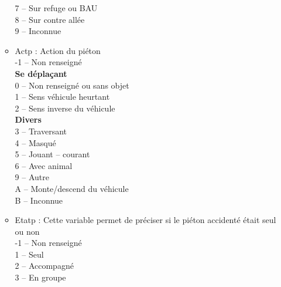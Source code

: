 \documentclass[french,]{tp}
\begin{document}
\begin{itemize}
\begin{itemize}
    7 -- Sur refuge ou BAU\\
    8 -- Sur contre allée\\
    9 -- Inconnue
  \item
    Actp : Action du piéton\\
    -1 -- Non renseigné\\
    \textbf{Se déplaçant}\\
    0 -- Non renseigné ou sans objet\\
    1 -- Sens véhicule heurtant\\
    2 -- Sens inverse du véhicule\\
    \textbf{Divers}\\
    3 -- Traversant\\
    4 -- Masqué\\
    5 -- Jouant -- courant\\
    6 -- Avec animal\\
    9 -- Autre\\
    A -- Monte/descend du véhicule\\
    B -- Inconnue
  \item
    Etatp : Cette variable permet de préciser si le piéton accidenté était seul ou non\\
    -1 -- Non renseigné\\
    1 -- Seul\\
    2 -- Accompagné\\
    3 -- En groupe
  \end{itemize}
\end{itemize}

%
% 
%
% 
\end{document}
